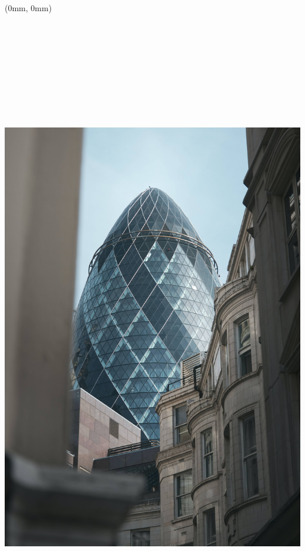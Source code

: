 \documentclass[
  a4paper,
  twoside, 11pt]{article}
\author{}
\date{\vspace{-2.5em}}
\begin{document}
\frenchspacing

\raggedright

\raggedbottom

\begin{textblock*}{21cm}(0mm, 0mm)
\includegraphics[width=21cm,height=29.7cm]{../2021_q2/cover_image_2021_q2.jpg}
\end{textblock*}
\end{document}

